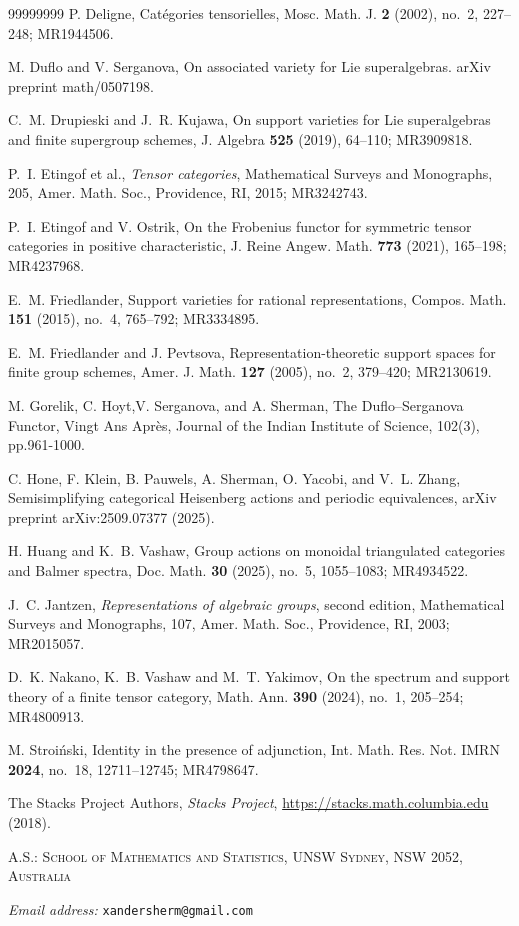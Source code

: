 \documentclass[11pt]{amsart}
\theoremstyle{definition}
\theoremstyle{remark}
\numberwithin{equation}{section}
\begin{document}
\begin{thebibliography}{99999999}
     P. Deligne, Cat\'egories tensorielles, Mosc. Math. J. {\bf 2} (2002), no.~2, 227--248; MR1944506.

     M. Duflo and V. Serganova, On associated variety for Lie superalgebras. arXiv preprint math/0507198.

     C.~M. Drupieski and J.~R. Kujawa, On support varieties for Lie superalgebras and finite supergroup schemes, J. Algebra {\bf 525} (2019), 64--110; MR3909818.

     P.~I. Etingof et al., {\it Tensor categories}, Mathematical Surveys and Monographs, 205, Amer. Math. Soc., Providence, RI, 2015; MR3242743.

     P.~I. Etingof and V. Ostrik, On the Frobenius functor for symmetric tensor categories in positive characteristic, J. Reine Angew. Math. {\bf 773} (2021), 165--198; MR4237968.

     E.~M. Friedlander, Support varieties for rational representations, Compos. Math. {\bf 151} (2015), no.~4, 765--792; MR3334895.

     E.~M. Friedlander and J. Pevtsova, Representation-theoretic support spaces for finite group schemes, Amer. J. Math. {\bf 127} (2005), no.~2, 379--420; MR2130619.

     M. Gorelik, C. Hoyt,V. Serganova, and A. Sherman, The Duflo–Serganova Functor, Vingt Ans Après, Journal of the Indian Institute of Science, 102(3), pp.961-1000.

     C. Hone, F. Klein, B. Pauwels, A. Sherman, O. Yacobi, and V.~L. Zhang, Semisimplifying categorical Heisenberg actions and periodic equivalences, arXiv preprint arXiv:2509.07377 (2025).

     H. Huang and K.~B. Vashaw, Group actions on monoidal triangulated categories and Balmer spectra, Doc. Math. {\bf 30} (2025), no.~5, 1055--1083; MR4934522.

     J.~C. Jantzen, {\it Representations of algebraic groups}, second edition, Mathematical Surveys and Monographs, 107, Amer. Math. Soc., Providence, RI, 2003; MR2015057.

     D.~K. Nakano, K.~B. Vashaw and M.~T. Yakimov, On the spectrum and support theory of a finite tensor category, Math. Ann. {\bf 390} (2024), no.~1, 205--254; MR4800913.

     M. Stroi\'nski, Identity in the presence of adjunction, Int. Math. Res. Not. IMRN {\bf 2024}, no.~18, 12711--12745; MR4798647.
    
     The Stacks Project Authors, \textit{Stacks Project}, \url{https://stacks.math.columbia.edu} (2018).

\end{thebibliography}

\textsc{\footnotesize A.S.: School of Mathematics and Statistics, UNSW Sydney, NSW 2052,
		Australia}
	

	
	\textit{\footnotesize Email address:} \texttt{\footnotesize xandersherm@gmail.com}
\end{document}
